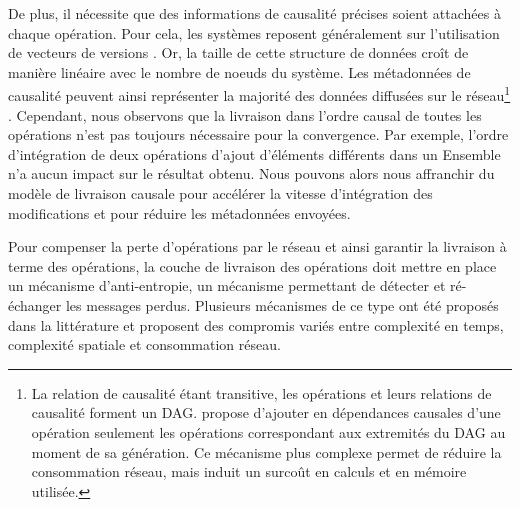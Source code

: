 De plus, il nécessite que des informations de causalité précises soient attachées à chaque opération.
Pour cela, les systèmes reposent généralement sur l'utilisation de vecteurs de versions \cite{1988-version-vector-mattern,1991-version-vector-fidge}.
Or, la taille de cette structure de données croît de manière linéaire avec le nombre de noeuds du système.
Les métadonnées de causalité peuvent ainsi représenter la majorité des données diffusées sur le réseau\footnote{
  La relation de causalité étant transitive, les opérations et leurs relations de causalité forment un DAG.
  \cite{1997-causal-barrier} propose d'ajouter en dépendances causales d'une opération seulement les opérations correspondant aux extremités du DAG au moment de sa génération.
  Ce mécanisme plus complexe permet de réduire la consommation réseau, mais induit un surcoût en calculs et en mémoire utilisée.
} \cite{enes2019}.
Cependant, nous observons que la livraison dans l'ordre causal de toutes les opérations n'est pas toujours nécessaire pour la convergence.
Par exemple, l'ordre d'intégration de deux opérations d'ajout d'éléments différents dans un Ensemble n'a aucun impact sur le résultat obtenu.
Nous pouvons alors nous affranchir du modèle de livraison causale pour accélérer la vitesse d'intégration des modifications et pour réduire les métadonnées envoyées.


Pour compenser la perte d'opérations par le réseau et ainsi garantir la livraison à terme des opérations, la couche de livraison des opérations doit mettre en place un mécanisme d'anti-entropie, \ie un mécanisme permettant de détecter et ré-échanger les messages perdus.
Plusieurs mécanismes de ce type ont été proposés dans la littérature \cite{1983-anti-entropy-vv, 2007-dynamo, 2015-approximate-hash-based-set-reconciliation, 2017-anti-entropy-without-merkle-trees}  et proposent des compromis variés entre complexité en temps, complexité spatiale et consommation réseau.

